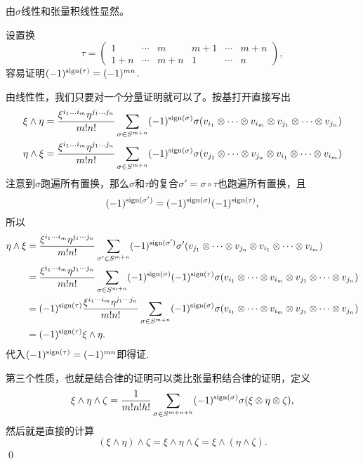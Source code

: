 \proof {} 由$\sigma$线性和张量积线性显然。

	 设置换
	\[
		\tau=
		\begin{pmatrix}
			1& \cdots & m & m+1 &\cdots &m+n\\
			1+n& \cdots & m+n & 1 &\cdots &n
		\end{pmatrix},
	\]
	容易证明$(-1)^{\operatorname{sign}(\tau)}=(-1)^{mn}$.

	由线性性，我们只要对一个分量证明就可以了。按基打开直接写出
	\[
		\begin{split}
			\xi \wedge \eta&=\frac{\xi^{i_1\dots i_m}\eta^{j_1 \dots j_n}}{m!n!}\sum_{\sigma\in S^{m+n}}(-1)^{\operatorname{sign}(\sigma)}\sigma(v_{i_1}\otimes \cdots \otimes v_{i_m}\otimes v_{j_1}\otimes \cdots \otimes v_{j_n})\\
			\eta \wedge \xi&=\frac{\xi^{i_1\dots i_m}\eta^{j_1 \dots j_n}}{m!n!}\sum_{\sigma\in S^{m+n}}(-1)^{\operatorname{sign}(\sigma)}\sigma(v_{j_1}\otimes \cdots \otimes v_{j_n}\otimes v_{i_1}\otimes \cdots \otimes v_{i_m})
		\end{split}
	\]
	注意到$\sigma$跑遍所有置换，那么$\sigma$和$\tau$的复合$\sigma'=\sigma\circ\tau$也跑遍所有置换，且
	\[(-1)^{\operatorname{sign}(\sigma')}=(-1)^{\operatorname{sign}(\sigma)}(-1)^{\operatorname{sign}(\tau)},\]所以
	\[
		\begin{split}
			\eta \wedge \xi&=\frac{\xi^{i_1\cdots i_m}\eta^{j_1 \cdots j_n}}{m!n!}\sum_{\sigma'\in S^{m+n}}(-1)^{\operatorname{sign}(\sigma')}\sigma'(v_{j_1}\otimes \cdots \otimes v_{j_n}\otimes v_{i_1}\otimes \cdots \otimes v_{i_m})\\
			&=\frac{\xi^{i_1\cdots i_m}\eta^{j_1 \cdots j_n}}{m!n!}\sum_{\sigma\in S^{m+n}}(-1)^{\operatorname{sign}(\sigma)}(-1)^{\operatorname{sign}(\tau)}\sigma(v_{i_1}\otimes \cdots \otimes v_{i_m}\otimes v_{j_1}\otimes \cdots \otimes v_{j_n})\\
			&=(-1)^{\operatorname{sign}(\tau)}\frac{\xi^{i_1\cdots i_m}\eta^{j_1 \cdots j_n}}{m!n!}\sum_{\sigma\in S^{m+n}}(-1)^{\operatorname{sign}(\sigma)}\sigma(v_{i_1}\otimes \cdots \otimes v_{i_m}\otimes v_{j_1}\otimes \cdots \otimes v_{j_n})\\
			&=(-1)^{\operatorname{sign}(\tau)} \xi \wedge \eta.
		\end{split}
	\]
	代入$(-1)^{\operatorname{sign}(\tau)}=(-1)^{mn}$即得证.

	第三个性质，也就是结合律的证明可以类比张量积结合律的证明，定义
	\[
		\xi \wedge \eta\wedge \zeta=\frac{1}{m!n!h!}\sum_{\sigma\in S^{m+n+h}}(-1)^{\operatorname{sign}(\sigma)}\sigma(\xi \otimes \eta \otimes \zeta),
	\]
	然后就是直接的计算
	\[
		(\xi \wedge \eta) \wedge \zeta=\xi \wedge \eta\wedge \zeta=\xi \wedge (\eta \wedge \zeta).
	\]
	\qed

